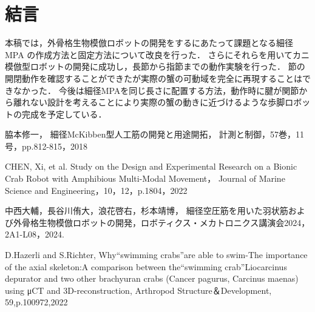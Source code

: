 \documentclass{jarticle}
\begin{document}
\begin{table}[!t]
  \centering
  \vspace{-2mm}
  \caption{実際の蟹と実機の可動域比較}
  \vspace{1mm}
  \label{tab:kadouiki}
\end{table}

\vspace*{-2mm}
\section{結言}
本稿では，外骨格生物模倣ロボットの開発をするにあたって課題となる細径MPA の作成方法と固定方法について改良を行った．
さらにそれらを用いてカニ模倣型ロボットの開発に成功し，長節から指節までの動作実験を行った．
節の開閉動作を確認することができたが実際の蟹の可動域を完全に再現することはできなかった．
今後は細径MPAを同じ長さに配置する方法，動作時に腱が関節から離れない設計を考えることにより実際の蟹の動きに近づけるような歩脚ロボットの完成を予定している．

\begin{thebibliography}{99}
  脇本修一，
  細径McKibben型人工筋の開発と用途開拓，
  計測と制御，57巻，11号，pp.812-815，2018
  
  CHEN, Xi, et al. Study on the Design and Experimental Research on a Bionic Crab Robot with Amphibious Multi-Modal Movement， Journal of Marine Science and Engineering，10，12，p.1804，2022
  
  中西大輔，長谷川侑大，浪花啓右，杉本靖博，
  細径空圧筋を用いた羽状筋および外骨格生物模倣ロボットの開発，ロボティクス・メカトロニクス講演会2024，2A1-L08，2024.

  D.Hazerli and S.Richter,
  Why“swimming crabs”are able to swim-The importance of the axial skeleton:A comparison between the“swimming crab”Liocarcinus depurator and two other brachyuran crabs (Cancer pagurus, Carcinus maenas) using μCT and 3D-reconstruction,
  Arthropod Structure＆Development,
  59,p.100972,2022

 \end{thebibliography}
\end{document}
